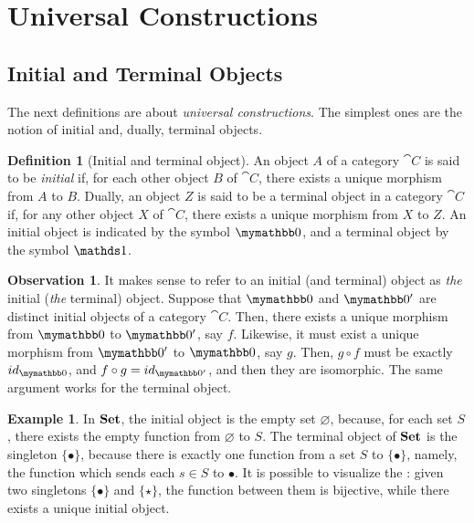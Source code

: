 \documentclass[a4paper, twoside,openright]{report}
\theoremstyle{plain}
\theoremstyle{definition}
\newtheorem{definition}[theorem]{Definition}
\newtheorem{example}[theorem]{Example}
\newtheorem{obs}[theorem]{Observation}
\begin{document}
\section{Universal Constructions}\label{sect:univ_constr}


\subsection{Initial and Terminal Objects}

The next definitions are about \emph{universal constructions}. The simplest ones are the notion of initial and, dually, terminal objects.

\begin{definition}[Initial and terminal object]
    An object $A$ of a category $\cat C$ is said to be \emph{initial} if, for each other object $B$ of $\cat C$, there exists a unique morphism from $A$ to $B$.
    Dually, an object $Z$ is said to be a terminal object in a category $\cat C$ if, for any other object $X$ of $\cat C$, there exists a unique morphism from $X$ to $Z$.
    An initial object is indicated by the symbol $\initial$, and a terminal object by the symbol $\terminal$.
\end{definition}

\begin{obs}\label{obs:terminal_are_isomorph}
    It makes sense to refer to an initial (and terminal) object as \emph{the} initial (\emph{the} terminal) object. Suppose that $\initial$ and $\initial'$ are distinct initial objects of a category $\cat C$. Then, there exists a unique morphism from $\initial$ to $\initial'$, say $f$. Likewise, it must exist a unique morphism from $\initial'$ to $\initial$, say $g$. Then, $g\circ f$ must be exactly $id_{\initial}$, and $f \circ g = id_{\initial'}$, and then they are isomorphic. The same argument works for the terminal object.
\end{obs}

\begin{example}\label{ex:set_init_term}
    In $\mathbf{Set}$, the initial object is the empty set $\varnothing$, because, for each set $S$, there exists the empty function from $\varnothing$ to $S$. The terminal object of $\mathbf{Set}$ is the singleton $\{ \bullet \}$, because there is exactly one function from a set $S$ to $\{ \bullet \}$, namely, the function which sends each $s \in S$ to $\bullet$. It is possible to visualize the : given two singletons $\{ \bullet \}$ and $\{ \star \}$, the function between them is bijective, while there exists a unique initial object.
\end{example}
\end{document}
